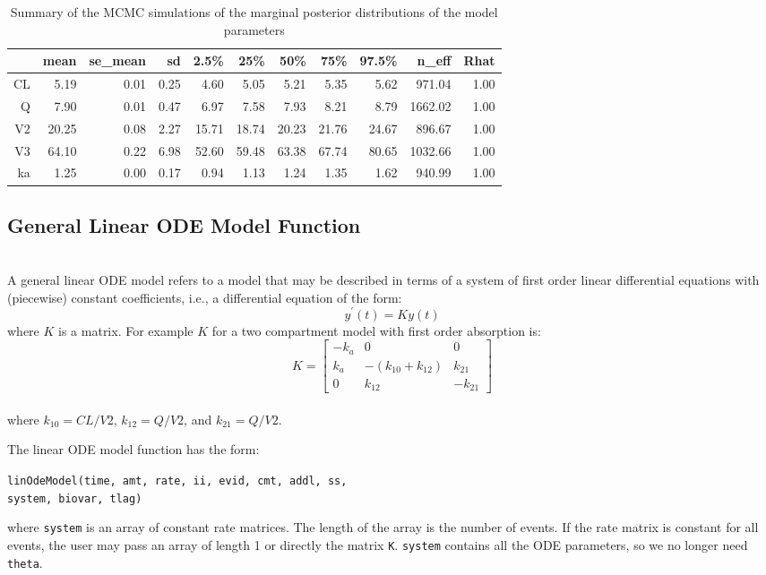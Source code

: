 \documentclass[11pt]{amsart}
\begin{document}
\begin{table}[!htb]
\centering
\caption{Summary of the MCMC simulations of the marginal posterior distributions of the model parameters}
\begin{tabular}{rrrrrrrrrrr}
  \hline
 & mean & se\_mean & sd & 2.5\% & 25\% & 50\% & 75\% & 97.5\% & n\_eff & Rhat \\ 
  \hline
CL & 5.19 & 0.01 & 0.25 & 4.60 & 5.05 & 5.21 & 5.35 & 5.62 & 971.04 & 1.00 \\ 
  Q & 7.90 & 0.01 & 0.47 & 6.97 & 7.58 & 7.93 & 8.21 & 8.79 & 1662.02 & 1.00 \\ 
  V2 & 20.25 & 0.08 & 2.27 & 15.71 & 18.74 & 20.23 & 21.76 & 24.67 & 896.67 & 1.00 \\ 
  V3 & 64.10 & 0.22 & 6.98 & 52.60 & 59.48 & 63.38 & 67.74 & 80.65 & 1032.66 & 1.00 \\ 
  ka & 1.25 & 0.00 & 0.17 & 0.94 & 1.13 & 1.24 & 1.35 & 1.62 & 940.99 & 1.00 \\ 
   \hline
\end{tabular}
\end{table}

\subsection{General Linear ODE Model Function} \ \\

A general linear ODE model refers to a model that may be described in terms of a system of first order linear differential equations with (piecewise) constant coefficients, i.e., a differential equation of the form:
$$ y^\prime\left(t\right) = Ky\left(t\right) $$
where $K$ is a matrix. For example $K$ for a two compartment model with first order absorption is:
$$   K = \left[\begin{array}{ccc}
	-k_a & 0 & 0 \\
	k_a & -\left(k_{10} + k_{12}\right) & k_{21} \\
	0 & k_{12} & -k_{21}
	\end{array}\right] $$ \\
where $k_{10} = CL / V2 $, $ k_{12} = Q / V2 $, and $k_{21} = Q / V2 $.

The linear ODE model function has the form:

\texttt{linOdeModel(time, amt, rate, ii, evid, cmt, addl, ss,\\
\phantom{linOdeModel} system, biovar, tlag)}

where \texttt{system} is an array of constant rate matrices. The length of the array is the number of events. If the rate matrix is constant for all events, the user may pass an array of length 1 or directly the matrix \texttt{K}.  \texttt{system} contains all the ODE parameters, so we no longer need \texttt{theta}.
\end{document}

